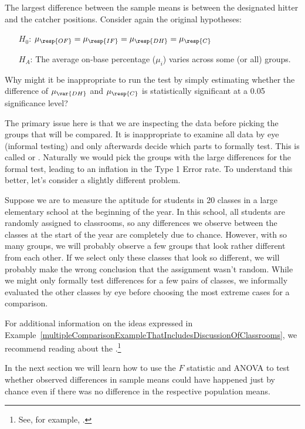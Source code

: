 \begin{example}{The largest difference between the sample means is between the designated hitter and the catcher positions. Consider again the original hypotheses:
\begin{itemize}
\setlength{\itemsep}{0mm}
\item[$H_0$:] $\mu_{\resp{OF}} = \mu_{\resp{IF}} = \mu_{\resp{DH}} = \mu_{\resp{C}}$
\item[$H_A$:] The average on-base percentage ($\mu_i$) varies across some (or all) groups.
\end{itemize}
Why might it be inappropriate to run the test by simply estimating whether the difference of $\mu_{\var{DH}}$ and $\mu_{\resp{C}}$ is statistically significant at a 0.05 significance level?}
\label{multipleComparisonExampleThatIncludesDiscussionOfClassrooms}
The primary issue here is that we are inspecting the data before picking the groups that will be compared. It is inappropriate to examine all data by eye (informal testing) and only afterwards decide which parts to formally test. This is called  or . Naturally we would pick the groups with the large differences for the formal test, leading to an inflation in the Type 1 Error rate. To understand this better, let's consider a slightly different problem.

Suppose we are to measure the aptitude for students in 20 classes in a large elementary school at the beginning of the year. In this school, all students are randomly assigned to classrooms, so any differences we observe between the classes at the start of the year are completely due to chance. However, with so many groups, we will probably observe a few groups that look rather different from each other. If we select only these classes that look so different, we will probably make the wrong conclusion that the assignment wasn't random. While we might only formally test differences for a few pairs of classes, we informally evaluated the other classes by eye before choosing the most extreme cases for a comparison.
\end{example}

For additional information on the ideas expressed in Example~\ref{multipleComparisonExampleThatIncludesDiscussionOfClassrooms}, we recommend reading about the .\footnote{See, for example, .}

In the next section we will learn how to use the $F$ statistic and ANOVA to test whether observed differences in sample means could have happened just by chance even if there was no difference in the respective population means.


